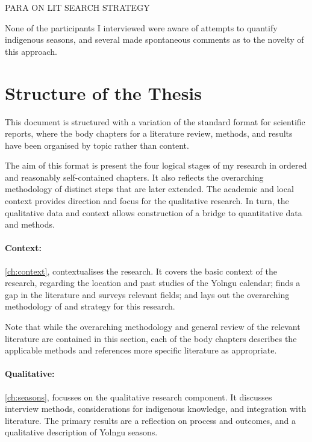 PARA ON LIT SEARCH STRATEGY

None of the participants I interviewed were aware of attempts to quantify indigenous seasons,
and several made spontaneous comments as to the novelty of this approach.





\section{Structure of the Thesis}

This document is structured with a variation of the standard format for scientific reports,
where the body chapters for a literature review, methods, and results
have been organised by topic rather than content.

The aim of this format is present the four logical stages of my research
in ordered and reasonably self-contained chapters.
It also reflects the overarching methodology of distinct steps that are
later extended.  The academic and local context provides direction and focus
for the qualitative research.  In turn, the qualitative data and context
allows construction of a bridge to quantitative data and methods.


\paragraph{Context:}
\autoref{ch:context}, \textit{} contextualises the research.
It covers the basic context of the research,
regarding the location and past studies of the Yolngu calendar;
finds a gap in the literature and surveys relevant fields;
and lays out the overarching methodology of and strategy for this research.

Note that while the overarching methodology and general review of the relevant literature
are contained in this section, each of the body chapters describes the applicable methods
and references more specific literature as appropriate.


\paragraph{Qualitative:}
\autoref{ch:seasons}, \textit{} focusses on the qualitative research component.
It discusses interview methods, considerations for indigenous knowledge, and integration with literature.
The primary results are a reflection on process and outcomes,
and a qualitative description of Yolngu seasons.


